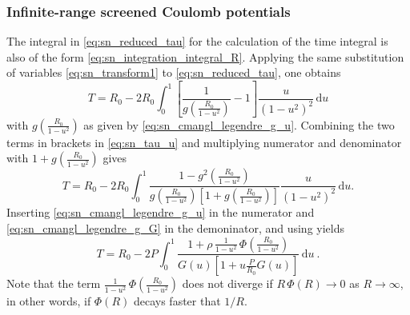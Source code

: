 
\subsubsection{Infinite-range screened Coulomb potentials}
%
The integral in \cref{eq:sn_reduced_tau} for the calculation of the time integral is also of the form \cref{eq:sn_integration_integral_R}. Applying the same substitution of variables \cref{eq:sn_transform1} to \cref{eq:sn_reduced_tau}, one obtains
%
\begin{equation}
    \label{eq:sn_tau_u}
    T = R_0 - 2 R_0 \int_0^1
        \left[ \frac{ 1 }{ g \left( \frac{ R_0 }{ 1-u^2 } \right) } - 1 \right]
        \frac{ u }{ (1-u^2)^2 }
        \, \mathrm{d}u
\end{equation}
%
with $g(\frac{R_0}{1-u^2})$ as given by \cref{eq:sn_cmangl_legendre_g_u}.
Combining the two terms in brackets in \cref{eq:sn_tau_u} and multiplying numerator and denominator with $1 + g(\frac{R_0}{1-u^2})$ gives
%
\begin{equation}
    \label{eq:sn_tau_u1}
    T = R_0 - 2 R_0 \int_0^1
        \frac{ 1 - g^2 \left( \frac{ R_0 }{ 1-u^2 } \right) }{
               g \left( \frac{ R_0 }{ 1-u^2 } \right)
               \left[ 1 + g \left( \frac{ R_0 }{ 1-u^2 } \right) \right] }
        \frac{ u }{ (1-u^2)^2 }
        \, \mathrm{d}u .
\end{equation}
%
Inserting \cref{eq:sn_cmangl_legendre_g_u} in the numerator and \cref{eq:sn_cmangl_legendre_g_G} in the demoninator, and using  yields
%
\begin{equation}
    \label{eq:sn_tau_G}
    T = R_0 - 2 P \int_0^1
        \frac{ 1 + \rho \, \frac{ 1 }{ 1-u^2 } \, \Phi \left( \frac{R_0}{1-u^2} \right) }{
               G(u) \left[ 1 + u \frac{P}{R_0} G(u) \right] }
        \, \mathrm{d}u ~.
\end{equation}
%
Note that the term $\frac{ 1 }{ 1-u^2 } \, \Phi \left( \frac{R_0}{1-u^2} \right)$ does not diverge if $R\, \Phi(R) \rightarrow 0$ as $R \rightarrow \infty$, in other words, if $\Phi(R)$ decays faster that $1/R$.

